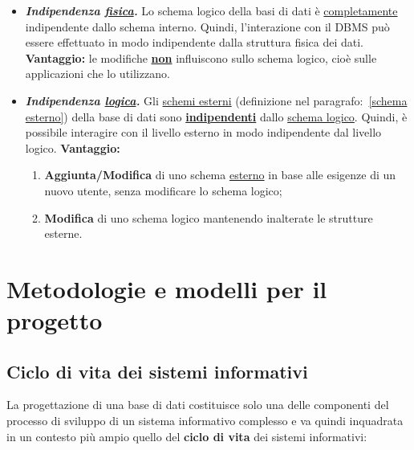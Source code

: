 \documentclass[a4paper]{article}
\begin{document}
	\begin{itemize}
		\item[\ding{42}] \textbf{\emph{Indipendenza \underline{fisica}.}} Lo schema logico della basi di dati è \underline{completamente} indipendente dallo schema interno. Quindi, l'interazione con il DBMS può essere effettuato in modo indipendente dalla struttura fisica dei dati.\newline
		\textcolor{Green4}{\textbf{Vantaggio:}} le modifiche \textbf{\underline{non}} influiscono sullo schema logico, cioè sulle applicazioni che lo utilizzano.
		
		\item[\ding{42}] \textbf{\emph{Indipendenza \underline{logica}.}} Gli \underline{schemi esterni} (definizione nel paragrafo:~\ref{schema esterno}) della base di dati sono \textbf{\underline{indipendenti}} dallo \underline{schema logico}. Quindi, è possibile interagire con il livello esterno in modo indipendente dal livello logico.\newline
		\textcolor{Green4}{\textbf{Vantaggio:}}
		\begin{enumerate}[label=\Roman*]
			\item \textbf{Aggiunta/Modifica} di uno schema \underline{esterno} in base alle esigenze di un nuovo utente, senza modificare lo schema logico;
			
			\item \textbf{Modifica} di uno schema logico mantenendo inalterate le strutture esterne.
		\end{enumerate}
	\end{itemize}

	\newpage
	
	


	\section{Metodologie e modelli per il progetto}
	
	\subsection{Ciclo di vita dei sistemi informativi}
	
	La progettazione di una base di dati costituisce solo una delle componenti del processo di sviluppo di un sistema informativo complesso e va quindi inquadrata in un contesto più ampio quello del \textbf{ciclo di vita} dei sistemi informativi:
	
\end{document}
